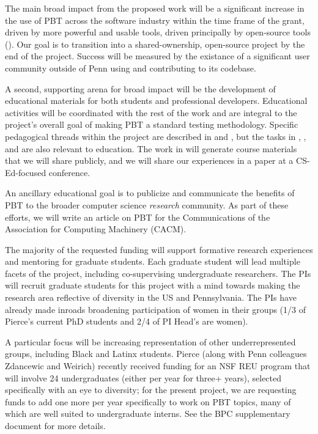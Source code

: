 {\smallskip
{} The main broad impact from the
proposed work will be a significant increase in the use of PBT across
the software industry within the time frame of the grant, driven
by more powerful and usable tools, driven principally by open-source
tools (). Our goal is to
transition \tyche{} into a shared-ownership, open-source project
by the end of the project.
Success will be measured by the existance of a
significant user community outside of Penn using \tyche{} and
contributing to its codebase.

\smallskip
{}
%
A second, supporting arena for broad impact will be the
development of educational materials for both students and
professional developers. Educational activities will be
coordinated with the rest of the work and are integral to the
project's overall goal of making PBT a standard testing methodology.
Specific pedagogical
threads within the project are described in  and , but the
tasks in
,
, and
 are also relevant to education. The
work in  will generate course materials that we will
share publicly, and we will share our experiences in a paper at a
CS-Ed-focused conference.

An ancillary educational goal is to
publicize and communicate the benefits of PBT to the broader computer science
{\em research} community. As part of these efforts, we will write an article on PBT
for the Communications of the Association for Computing Machinery
(CACM).

\smallskip
{}
%
The majority of the requested funding will support formative research
experiences and mentoring for graduate students. Each graduate
student will lead multiple facets of the
project, including co-supervising undergraduate
researchers.
%
The PIs will recruit graduate students for this project with a mind towards making
the research area reflective of diversity in the US and Pennsylvania.
The PIs have already made inroads broadening participation of women in their
groups (1/3 of Pierce's current PhD students and 2/4 of PI
Head's are women).

A particular focus
will be increasing representation of
other underrepresented groups, including Black and Latinx
students. Pierce (along with Penn colleagues Zdancewic and Weirich)
recently received funding for an
NSF REU program that will involve 24 undergraduates (either per
year for three+ years), selected specifically with an eye to diversity;
for the present project, we are requesting funds to add one more per
year specifically to work on PBT topics, many of which are well suited
to undergraduate interns. See the BPC
supplementary
document for more details.

}
